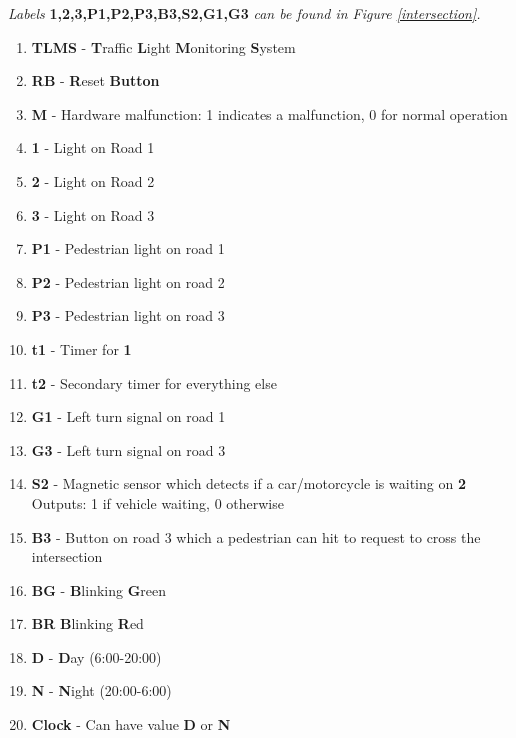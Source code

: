 \documentclass[letterpaper]{article}
\begin{document}
\textit{Labels}
\textbf{1,2,3,P1,P2,P3,B3,S2,G1,G3}
\textit{can be found in Figure \ref{intersection}.}
\begin{enumerate}

 \item \textbf{TLMS} -
       \textbf{T}raffic
       \textbf{L}ight
       \textbf{M}onitoring
       \textbf{S}ystem
       
 \item \textbf{RB} -
       \textbf{R}eset
       \textbf{Button}
 \item \textbf{M} - Hardware malfunction: 1 indicates a malfunction, 0 for normal operation
 \item \textbf{1} - Light on Road 1
 \item \textbf{2} - Light on Road 2
 \item \textbf{3} - Light on Road 3
 \item \textbf{P1} - Pedestrian light on road 1
 \item \textbf{P2} - Pedestrian light on road 2
 \item \textbf{P3} - Pedestrian light on road 3
 \item \textbf{t1} - Timer for \textbf{1}
 \item \textbf{t2} - Secondary timer for everything else
 \item \textbf{G1} - Left turn signal on road 1
 \item \textbf{G3} - Left turn signal on road 3
 \item \textbf{S2} - Magnetic sensor which detects if a car/motorcycle is waiting on \textbf{2}\\
       Outputs: 1 if vehicle waiting, 0 otherwise
 \item \textbf{B3} - Button on road 3 which a pedestrian can hit to request to cross the intersection
 \item \textbf{BG} -
       \textbf{B}linking
       \textbf{G}reen
 \item \textbf{BR}
       \textbf{B}linking
       \textbf{R}ed
 \item \textbf{D} - \textbf{D}ay (6:00-20:00)
 \item \textbf{N} - \textbf{N}ight (20:00-6:00)
 \item \textbf{Clock} - Can have value \textbf{D} or \textbf{N}
\end{enumerate}
\end{document}

